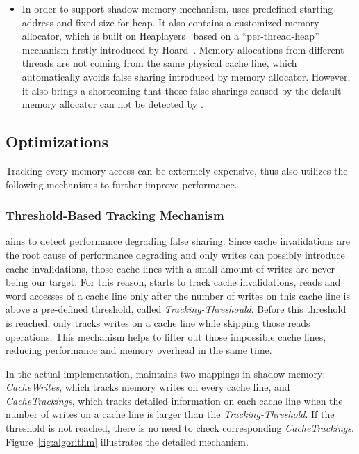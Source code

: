 \begin{itemize}
\item
In order to support shadow memory mechanism,  uses predefined starting address and 
fixed size for heap. It also contains a customized memory allocator, which is built on 
Heaplayers~\cite{heaplayers} based on a ``per-thread-heap'' mechanism firstly introduced 
by Hoard~\cite{Hoard}. Memory allocations from different threads 
are not coming from the same physical cache line, which automatically avoids false sharing 
introduced by memory allocator.
However, it also brings a shortcoming that those false sharings caused by the default memory 
allocator can not be detected by . 

\end{itemize} 
 
\subsection{Optimizations}
\label{optimization}
Tracking every memory access can be extermely expensive, thus 
 also utilizes the following mechanisms to further improve performance.

\subsubsection{Threshold-Based Tracking Mechanism}
\label{sec:thresholdtracking}
\Defaults{} aims to detect performance degrading false sharing.
Since cache invalidations are the root cause of performance degrading and only writes 
can possibly introduce cache invalidations, 
those cache lines with a small amount of writes are never being our target.
For this reason,  starts to track cache invalidations, reads and word accesses 
of a cache line only after the number of writes on this cache line is above a
pre-defined threshold, called {\it Tracking-Threshould}. 
Before this threshold is reached,  only tracks writes on a cache line 
while skipping those reads operations. 
This mechanism helps to filter out
those impossible cache lines, reducing performance and memory overhead
in the same time.

In the actual implementation,  maintains two mappings in shadow memory: 
{\it CacheWrites}, which tracks memory writes on every cache line, 
and {\it CacheTrackings}, which tracks detailed information 
on each cache line when the number of writes on a cache line is larger than
the {\it Tracking-Threshold}. 
If the threshold is not reached, there is no need to check corresponding {\it CacheTrackings}. 
Figure~\ref{fig:algorithm} illustrates the detailed mechanism.

